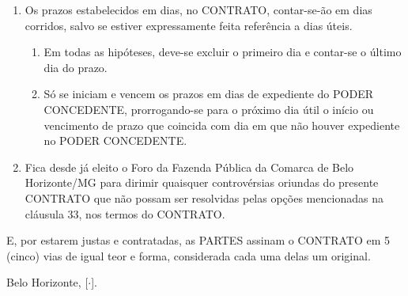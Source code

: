 \documentclass[a4paper,11pt]{report} %
\newcommand{\DataAssinatura}{[$\cdot$]}
\begin{document}
\begin{enumerate}
\item \label{itm:LYQH} Os prazos estabelecidos em dias, no CONTRATO, contar-se-ão em dias corridos, salvo se estiver expressamente feita referência a dias úteis.

\begin{enumerate}[label*=\arabic*.]
\item \label{itm:EH4M} Em todas as hipóteses, deve-se excluir o primeiro dia e contar-se o último dia do prazo.
\item \label{itm:4URU} Só se iniciam e vencem os prazos em dias de expediente do PODER CONCEDENTE, prorrogando-se para o próximo dia útil o início ou vencimento de prazo que coincida com dia em que não houver expediente no PODER CONCEDENTE.
\end{enumerate}

\item \label{itm:N98N} Fica desde já eleito o Foro da Fazenda Pública da Comarca de Belo Horizonte/MG para dirimir quaisquer controvérsias oriundas do presente CONTRATO que não possam ser resolvidas pelas opções mencionadas na cláusula 33, nos termos do CONTRATO.

\end{enumerate}

E, por estarem justas e contratadas, as PARTES assinam o CONTRATO em 5 (cinco) vias de igual teor e forma, considerada cada uma delas um original.

Belo Horizonte, \DataAssinatura.

\end{document}
